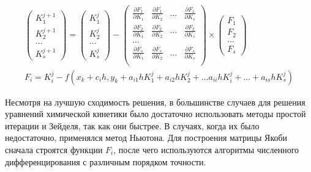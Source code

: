 \begin{equation}
    \begin{gathered}
        \begin{pmatrix}
            K_1^{j + 1}\\
            K_2^{j + 1}\\
            ...\\
            K_s^{j + 1}
        \end{pmatrix}
        =
        \begin{pmatrix}
            K_1^{j}\\
            K_2^{j}\\
            ...\\
            K_s^{j}
        \end{pmatrix}
        -
        \begin{pmatrix}
            \frac{\partial F_1}{\partial K_1} & \frac{\partial F_1}{\partial K_2} & ... & \frac{\partial F_1}{\partial K_s}\\
            \frac{\partial F_2}{\partial K_1} & \frac{\partial F_2}{\partial K_2} & ... & \frac{\partial F_2}{\partial K_s}\\
            ...\\
            \frac{\partial F_s}{\partial K_1} & \frac{\partial F_s}{\partial K_2} & ... & \frac{\partial F_s}{\partial K_s}\\
        \end{pmatrix}
        \times
        \begin{pmatrix}
            F_1\\
            F_2\\
            ...\\
            F_s
        \end{pmatrix}\\
        F_i = K_i^j - f(x_k + c_ih, y_k + a_{i1}hK_1^{j} + a_{i2}hK_2^{j} + ... a_{ii}hK_i^{j} + ... + a_{is}hK_s^{j})
    \end{gathered}
    \label{eq:Newton}
\end{equation}

Несмотря на лучшую сходимость решения, в большинстве случаев для решения уравнений химической кинетики было достаточно использовать
методы простой итерации и Зейделя, так как они быстрее. В случаях, когда их было недостаточно, применялся метод Ньютона. 
Для построения матрицы Якоби сначала строятся функции $F_i$, после чего используются алгоритмы численного дифференцирования с
различным порядком точности.

